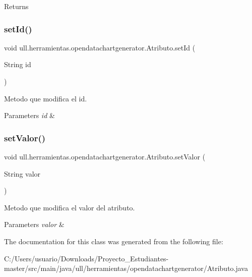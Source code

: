 \begin{DoxyReturn}{Returns}

\end{DoxyReturn}
\mbox{\label{classull_1_1herramientas_1_1opendatachartgenerator_1_1_atributo_af96fc3bf2e7f057d37eadbb72c9f0520}} 
\subsubsection{\texorpdfstring{set\+Id()}{setId()}}
{\footnotesize\ttfamily void ull.\+herramientas.\+opendatachartgenerator.\+Atributo.\+set\+Id (\begin{DoxyParamCaption}\item[{String}]{id }\end{DoxyParamCaption})}



Metodo que modifica el id. 


\begin{DoxyParams}{Parameters}
{\em id} & \\
\hline
\end{DoxyParams}
\mbox{\label{classull_1_1herramientas_1_1opendatachartgenerator_1_1_atributo_aed419fb7b2986d23375c1f84f82d05b1}} 
\subsubsection{\texorpdfstring{set\+Valor()}{setValor()}}
{\footnotesize\ttfamily void ull.\+herramientas.\+opendatachartgenerator.\+Atributo.\+set\+Valor (\begin{DoxyParamCaption}\item[{String}]{valor }\end{DoxyParamCaption})}



Metodo que modifica el valor del atributo. 


\begin{DoxyParams}{Parameters}
{\em valor} & \\
\hline
\end{DoxyParams}


The documentation for this class was generated from the following file\+:\begin{DoxyCompactItemize}
\item 
C\+:/\+Users/usuario/\+Downloads/\+Proyecto\+\_\+\+Estudiantes-\/master/src/main/java/ull/herramientas/opendatachartgenerator/Atributo.\+java\end{DoxyCompactItemize}
